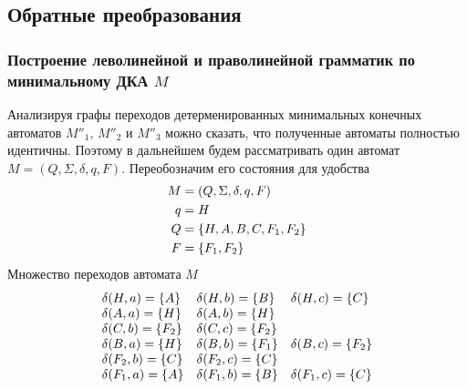 \subsection{Обратные преобразования}
\subsubsection{Построение леволинейной и праволинейной грамматик по минимальному ДКА \(M\)}

Анализируя графы переходов детерменированных минимальных конечных автоматов \(M''_1\), \(M''_2\) и \(M''_3\) можно сказать, что полученные автоматы полностью идентичны. Поэтому в дальнейшем будем рассматривать один автомат \(M = (Q, \Sigma, \delta, q, F)\). Переобозначим его состояния для удобства
\begin{align*}
	M & = (Q, \Sigma, \delta, q, F)  \\
	q & = H                          \\
	Q & = \left\{H, A, B, C, F_1, F_2\right\} \\
	F & = \left\{F_1, F_2\right\}
\end{align*}
Множество переходов автомата \(M\)
\begin{align*}
	\begin{array}{lll}
		\delta(H, a) = \left\{A\right\}     & \delta(H, b) = \left\{B\right\}     & \delta(H, c) = \left\{C\right\}     \\
		\delta(A, a) = \left\{H\right\}     & \delta(A, b) = \left\{H\right\}                                  \\
		\delta(C, b) = \left\{F_{2}\right\} & \delta(C, c) = \left\{F_{2}\right\}                              \\
		\delta(B, a) = \left\{H\right\}     & \delta(B, b) = \left\{F_1\right\}   & \delta(B, c) = \left\{F_{2}\right\} \\
		\delta(F_{2}, b) = \left\{C\right\} & \delta(F_{2}, c) = \left\{C\right\}                              \\
		\delta(F_1, a) = \left\{A\right\}   & \delta(F_1, b) = \left\{B\right\}   & \delta(F_1, c) = \left\{C\right\}   \\
	\end{array}
\end{align*}

